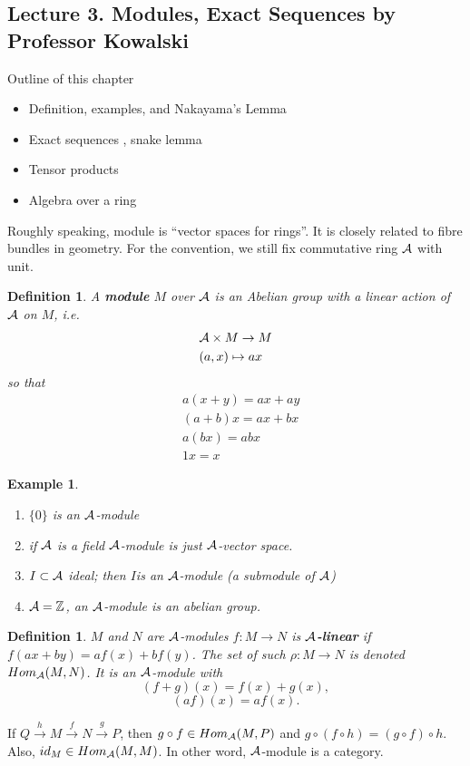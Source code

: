 \documentclass[11pt]{article}
\newtheorem{dfn}[thm]{Definition}
\newtheorem{ex}[thm]{Example}
\newcommand{\intg}{\mathbb Z}
\newcommand{\cala}{{\cal A}}
\newcommand{\lrta}{\longrightarrow}
\begin{document}
\subsection{Lecture 3. Modules, Exact Sequences by Professor Kowalski}
Outline of this chapter 
\begin{itemize}
\item Definition, examples, and Nakayama's Lemma
\item Exact sequences , snake lemma
\item Tensor products
\item Algebra over a ring
\end{itemize}
Roughly speaking, module is ``vector spaces for rings''. It is closely related to fibre bundles in geometry. For the convention, we still fix commutative ring $\cala$ with unit.
\begin{dfn}
A \textbf{module} $M$ over $\cala$ is an Abelian group with a linear action of $\cala$ on $M$, i.e.
$$
\begin{aligned}
& \cala\times M\rightarrow M\\
& (a,x)\mapsto ax
\end{aligned}
$$
so that 
$$
\begin{aligned}
&a(x+y)=ax+ay\\
&(a+b)x=ax+bx\\
&a(bx)=ab x\\
& 1 x= x
\end{aligned}
$$
\end{dfn}

\begin{ex}\ 
\begin{enumerate}
\item $\{0\}$ is an $\cala$-module
\item if $\cala$ is a field $\cala$-module is just $\cala$-vector space.
\item $I\subset\cala$ ideal; then $I$is an $\cala$-module (a submodule of $\cala$)
\item $\cala=\intg$, an $\cala$-module is an abelian group.
\end{enumerate}
\end{ex}

\begin{dfn}
$M$ and $N$ are $\cala$-modules $f:M\rightarrow N$ is  \textbf{$\cala$-linear} if $f(ax+by)=af(x)+bf(y)$. The set of such $\rho:M\rightarrow N$ is denoted $Hom_{\cala}(M,N)$. It is an $\cala$-module with
$$
(f+g)(x)=f(x)+g(x),
$$
$$
(af)(x)=af(x).
$$
\end{dfn}
If
$Q\overset{h}{\lrta }M\overset{f}{\lrta} N\overset{g}{\lrta} P$, then $g\circ f\in Hom_\cala(M,P)$ and $g\circ(f\circ h)=(g\circ f)\circ h$. Also, $id_M\in Hom_\cala(M,M)$. In other word, $\cala$-module is a category.
\end{document}
